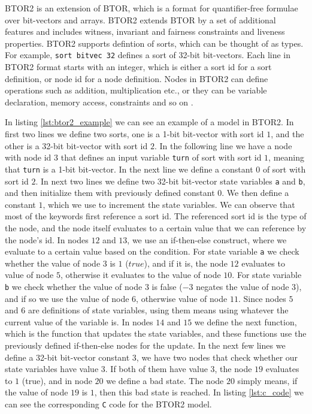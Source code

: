 \documentclass[12pt]{article}
\begin{document}
BTOR2 is an extension of BTOR, which is a format for quantifier-free formulae
over bit-vectors and arrays. BTOR2 extends BTOR by a set of additional features
and includes witness, invariant and fairness constraints and liveness
properties. BTOR2 supports defintion of sorts, which can be thought of as
types. For example, \texttt{sort bitvec 32} defines a sort of 32-bit
bit-vectors. Each line in BTOR2 format starts with an integer, which is either
a sort id for a sort definition, or node id for a node definition. Nodes in
BTOR2 can define operations such as addition, multiplication etc., or they can
be variable declaration, memory access, constraints and so on \cite{btor2}.

In listing \ref{lst:btor2_example} we can see an example of a model in BTOR2.
In first two lines we define two sorts, one is a 1-bit bit-vector with sort id
$1$, and the other is a 32-bit bit-vector with sort id $2$. In the following
line we have a node with node id $3$ that defines an input variable
\texttt{turn} of sort with sort id $1$, meaning that \texttt{turn} is a 1-bit
bit-vector. In the next line we define a constant $0$ of sort with sort id $2$.
In next two lines we define two 32-bit bit-vector state variables \texttt{a}
and \texttt{b}, and then initialize them with previously defined constant $0$.
We then define a constant $1$, which we use to increment the state variables.
We can observe that most of the keywords first reference a sort id. The
referenced sort id is the type of the node, and the node itself evaluates to a
certain value that we can reference by the node's id. In nodes $12$ and $13$,
we use an if-then-else construct, where we evaluate to a certain value based on
the condition. For state variable \texttt{a} we check whether the value of node
$3$ is $1$ ($true$), and if it is, the node $12$ evaluates to value of node
$5$, otherwise it evaluates to the value of node $10$. For state variable
\texttt{b} we check whether the value of node $3$ is false ($-3$ negates the
value of node $3$), and if so we use the value of node $6$, otherwise value of
node $11$. Since nodes $5$ and $6$ are definitions of state variables, using
them means using whatever the current value of the variable is. In nodes $14$
and $15$ we define the next function, which is the function that updates the
state variables, and these functions use the previously defined if-then-else
nodes for the update. In the next few lines we define a 32-bit bit-vector
constant $3$, we have two nodes that check whether our state variables have
value $3$. If both of them have value $3$, the node $19$ evaluates to $1$
(true), and in node $20$ we define a bad state. The node $20$ simply means, if
the value of node $19$ is $1$, then this bad state is reached. In listing
\ref{lst:c_code} we can see the corresponding \texttt{C} code for the BTOR2
model.
\end{document}
